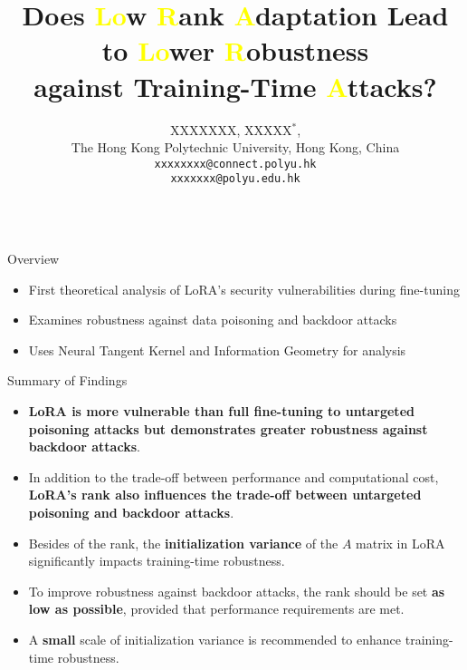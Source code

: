 \documentclass[final,hyperref={pdfpagelabels=false}]{beamer}
\title{Does \textcolor{yellow}{Lo}w \textcolor{yellow}{R}ank \textcolor{yellow}{A}daptation Lead to \textcolor{yellow}{Lo}wer \textcolor{yellow}{R}obustness\\
  against Training-Time \textcolor{yellow}{A}ttacks?}
\author{
  XXXXXXX, XXXXX$^{*}$,
\\
  The Hong Kong Polytechnic University, Hong Kong, China\\
  \texttt{xxxxxxxx@connect.polyu.hk}\\
  \texttt{xxxxxxx@polyu.edu.hk}\\
}
\newcommand{\shrink}{-15pt}
\begin{document}

\begin{frame}[t] %

\begin{columns}[t] %



  \begin{column}{.34\textwidth} %

    \begin{block}{Overview}
      \begin{itemize}
      \item First theoretical analysis of LoRA's security vulnerabilities during fine-tuning
      \item Examines robustness against data poisoning and backdoor attacks
      \item Uses Neural Tangent Kernel and Information Geometry for analysis
      \end{itemize}
    \end{block}

    \begin{block}{Summary of Findings}
      \begin{itemize}
\item \textbf{LoRA is more vulnerable than full fine-tuning to untargeted
  poisoning attacks but demonstrates greater robustness against
  backdoor attacks}.
\item In addition to the trade-off between performance and
  computational cost, \textbf{LoRA’s rank also influences the trade-off
  between untargeted poisoning and backdoor attacks}.
\item Besides of the rank, the \textbf{initialization variance} of the $A$ matrix in LoRA
  significantly impacts training-time robustness.
\item To improve robustness against backdoor attacks, the rank should
  be set \textbf{as low as possible}, provided that performance requirements
  are met.
\item A \textbf{small} scale of initialization variance is recommended to
  enhance training-time robustness.
      \end{itemize}
    \end{block}


\end{column}
\end{columns}
\end{frame}
\end{document}
